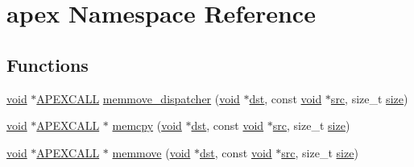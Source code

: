 \hypertarget{namespaceapex}{}\section{apex Namespace Reference}
\label{namespaceapex}
\subsection*{Functions}
\begin{DoxyCompactItemize}
\item 
\mbox{\hyperlink{glad_8h_a950fc91edb4504f62f1c577bf4727c29}{void}} $\ast$\mbox{\hyperlink{apex__memmove_8h_a6aba84fc57ecd226cfbf8156697e64a5}{A\+P\+E\+X\+C\+A\+LL}} \mbox{\hyperlink{namespaceapex_a52dc1ca765f4e3d6772f15b4323928b3}{memmove\+\_\+dispatcher}} (\mbox{\hyperlink{glad_8h_a950fc91edb4504f62f1c577bf4727c29}{void}} $\ast$\mbox{\hyperlink{glad_8h_a85e59cd56e10d0a7f49ab199f277d486}{dst}}, const \mbox{\hyperlink{glad_8h_a950fc91edb4504f62f1c577bf4727c29}{void}} $\ast$\mbox{\hyperlink{glad_8h_a2a98ddb6f79ec1048ff9e15cdd2422ba}{src}}, size\+\_\+t \mbox{\hyperlink{glad_8h_adead0e00f1033fff2918e18853add2b1}{size}})
\item 
\mbox{\hyperlink{glad_8h_a950fc91edb4504f62f1c577bf4727c29}{void}} $\ast$\mbox{\hyperlink{apex__memmove_8h_a6aba84fc57ecd226cfbf8156697e64a5}{A\+P\+E\+X\+C\+A\+LL}} $\ast$ \mbox{\hyperlink{namespaceapex_a79e1dc7e1396c622877b8fbe32ea80c8}{memcpy}} (\mbox{\hyperlink{glad_8h_a950fc91edb4504f62f1c577bf4727c29}{void}} $\ast$\mbox{\hyperlink{glad_8h_a85e59cd56e10d0a7f49ab199f277d486}{dst}}, const \mbox{\hyperlink{glad_8h_a950fc91edb4504f62f1c577bf4727c29}{void}} $\ast$\mbox{\hyperlink{glad_8h_a2a98ddb6f79ec1048ff9e15cdd2422ba}{src}}, size\+\_\+t \mbox{\hyperlink{glad_8h_adead0e00f1033fff2918e18853add2b1}{size}})
\item 
\mbox{\hyperlink{glad_8h_a950fc91edb4504f62f1c577bf4727c29}{void}} $\ast$\mbox{\hyperlink{apex__memmove_8h_a6aba84fc57ecd226cfbf8156697e64a5}{A\+P\+E\+X\+C\+A\+LL}} $\ast$ \mbox{\hyperlink{namespaceapex_a8019d939588203adc6e0c870b9c94bc2}{memmove}} (\mbox{\hyperlink{glad_8h_a950fc91edb4504f62f1c577bf4727c29}{void}} $\ast$\mbox{\hyperlink{glad_8h_a85e59cd56e10d0a7f49ab199f277d486}{dst}}, const \mbox{\hyperlink{glad_8h_a950fc91edb4504f62f1c577bf4727c29}{void}} $\ast$\mbox{\hyperlink{glad_8h_a2a98ddb6f79ec1048ff9e15cdd2422ba}{src}}, size\+\_\+t \mbox{\hyperlink{glad_8h_adead0e00f1033fff2918e18853add2b1}{size}})
\end{DoxyCompactItemize}


